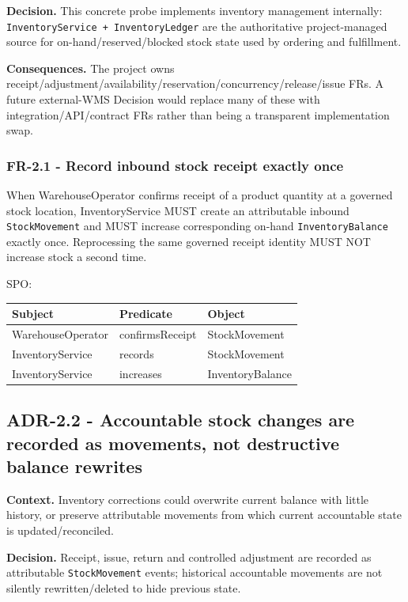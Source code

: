 \documentclass[
  10pt,
]{article}
\begin{document}
\textbf{Decision.} This concrete probe implements inventory management
internally: \texttt{InventoryService\ +\ InventoryLedger} are the
authoritative project-managed source for on-hand/reserved/blocked stock
state used by ordering and fulfillment.

\textbf{Consequences.} The project owns
receipt/adjustment/availability/reservation/concurrency/release/issue
FRs. A future external-WMS Decision would replace many of these with
integration/API/contract FRs rather than being a transparent
implementation swap.

\subsubsection{FR-2.1 - Record inbound stock receipt exactly
once}\label{fr-21---record-inbound-stock-receipt-exactly-once}

When WarehouseOperator confirms receipt of a product quantity at a
governed stock location, InventoryService MUST create an attributable
inbound \texttt{StockMovement} and MUST increase corresponding on-hand
\texttt{InventoryBalance} exactly once. Reprocessing the same governed
receipt identity MUST NOT increase stock a second time.

SPO:

\begin{longtable}[]{@{}lll@{}}
\toprule\noalign{}
Subject & Predicate & Object \\
\midrule\noalign{}
\endhead
\bottomrule\noalign{}
\endlastfoot
WarehouseOperator & confirmsReceipt & StockMovement \\
InventoryService & records & StockMovement \\
InventoryService & increases & InventoryBalance \\
\end{longtable}

\subsection{ADR-2.2 - Accountable stock changes are recorded as
movements, not destructive balance
rewrites}\label{adr-22---accountable-stock-changes-are-recorded-as-movements-not-destructive-balance-rewrites}

\textbf{Context.} Inventory corrections could overwrite current balance
with little history, or preserve attributable movements from which
current accountable state is updated/reconciled.

\textbf{Decision.} Receipt, issue, return and controlled adjustment are
recorded as attributable \texttt{StockMovement} events; historical
accountable movements are not silently rewritten/deleted to hide
previous state.
\end{document}

